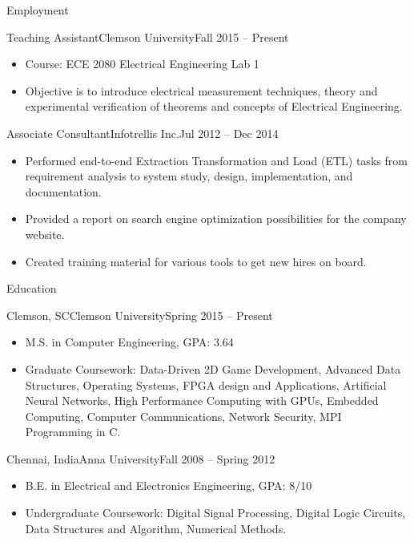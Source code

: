 \documentclass[]{SriramMadhivanan}
\begin{document}
	\makeheader
	
	\begin{cvsection}{Employment}
		\begin{cvsubsection}{Teaching Assistant}{Clemson University}{Fall 2015 -- Present}		
			\begin{itemize}
				\item Course: ECE 2080 Electrical Engineering Lab 1
				\item Objective is to introduce electrical measurement techniques, theory and experimental verification of theorems and concepts of Electrical Engineering.
			\end{itemize}
		\end{cvsubsection}
		
		
		\begin{cvsubsection}{Associate Consultant}{Infotrellis Inc.}{Jul 2012 -- Dec 2014}		
			\begin{itemize}
				\item Performed end-to-end Extraction Transformation and Load (ETL) tasks from requirement analysis to system study, design, implementation, and documentation.
				\item Provided a report on search engine optimization possibilities for the company website.
				\item Created training material for various tools to get new hires on board.				
			\end{itemize}
		\end{cvsubsection}
	\end{cvsection}
	
	\begin{cvsection}{Education}
		\begin{cvsubsection}{Clemson, SC}{Clemson University}{Spring 2015 -- Present}
			\begin{itemize}
				\item M.S. in Computer Engineering, GPA: 3.64
				\item Graduate Coursework: Data-Driven 2D Game Development, Advanced Data Structures, Operating Systems, FPGA design and Applications, Artificial Neural Networks, High Performance Computing with GPUs, Embedded Computing, Computer Communications, Network Security, MPI Programming in C.
			\end{itemize}
		\end{cvsubsection}
		
		\begin{cvsubsection}{Chennai, India}{Anna University}{Fall 2008 -- Spring 2012}
			\begin{itemize}
				\item B.E. in Electrical and Electronics Engineering, GPA: 8/10
				\item Undergraduate Coursework: Digital Signal Processing, Digital Logic Circuits, Data Structures and Algorithm, Numerical Methods.
			\end{itemize}
		\end{cvsubsection}
	\end{cvsection}
	
\end{document}
